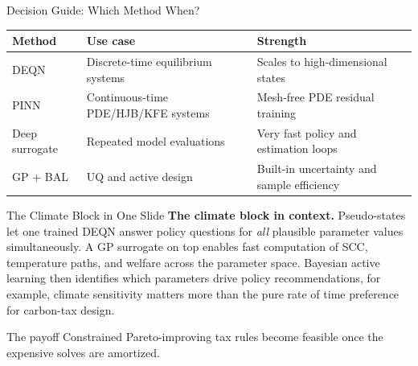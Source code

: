 \documentclass[aspectratio=169,11pt]{beamer}
\begin{document}
\begin{frame}{Decision Guide: Which Method When?}
\scriptsize
\begin{center}
\begin{tabular}{p{}p{}p{}}
\toprule
\textbf{Method} & \textbf{Use case} & \textbf{Strength} \\
\midrule
DEQN & Discrete-time equilibrium systems & Scales to high-dimensional states \\
PINN & Continuous-time PDE/HJB/KFE systems & Mesh-free PDE residual training \\
Deep surrogate & Repeated model evaluations & Very fast policy and estimation loops \\
GP + BAL & UQ and active design & Built-in uncertainty and sample efficiency \\
\bottomrule
\end{tabular}
\end{center}
\end{frame}

\begin{frame}{The Climate Block in One Slide}
\textbf{The climate block in context.}  Pseudo-states let one trained DEQN answer policy questions for \emph{all} plausible parameter values simultaneously.  A GP surrogate on top enables fast computation of SCC, temperature paths, and welfare across the parameter space.  Bayesian active learning then identifies which parameters drive policy recommendations, for example, climate sensitivity matters more than the pure rate of time preference for carbon-tax design.

\vspace{0.25cm}
\begin{exampleblock}{The payoff}
Constrained Pareto-improving tax rules become feasible once the expensive solves are amortized.
\end{exampleblock}
\end{frame}
\end{document}
